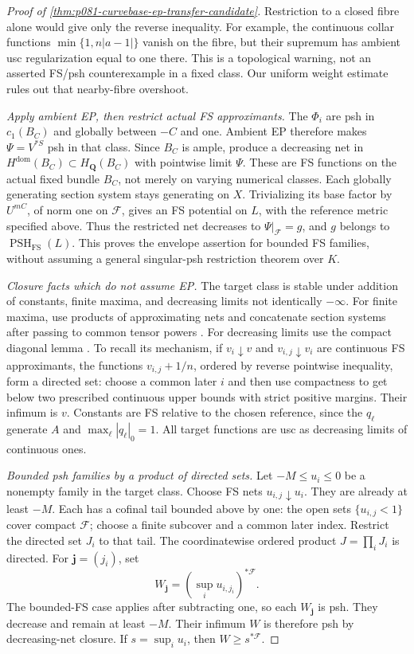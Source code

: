 \begin{proof}[Proof of \cref{thm:p081-curvebase-ep-transfer-candidate}]
Restriction to a closed fibre alone would give only the reverse
inequality. For example, the continuous collar functions
\(\min\{1,n|a-1|\}\) vanish on the fibre, but their supremum has
ambient usc regularization equal to one there. This is a topological
warning, not an asserted FS/psh counterexample in a fixed class.
Our uniform weight estimate rules out that nearby-fibre overshoot.

\emph{Apply ambient EP, then restrict actual FS approximants.}
The \(\Phi_i\) are psh in \(c_1(B_C)\) and globally between \(-C\)
and one. Ambient EP therefore makes
\(\Psi=V^{*S}\) psh in that class. Since \(B_C\) is ample,
\cite[Theorem~4.15(iii) and Example~3.9]{BJ22} produce a decreasing
net in \(H^{\mathrm{dom}}(B_C)\subset H_{\mathbf Q}(B_C)\)
with pointwise limit \(\Psi\). These are FS functions on the actual
fixed bundle \(B_C\), not merely on varying numerical classes.
Each globally generating section system stays generating on \(X\).
Trivializing its base factor by \(U^{mC}\), of norm one on
\(\mathcal F\), gives an FS potential on \(L\), with the reference
metric specified above. Thus the restricted net decreases to
\(\Psi|_{\mathcal F}=g\), and \(g\) belongs to
\(\operatorname{PSH}_{\mathrm{FS}}(L)\).
This proves the envelope assertion for bounded FS families, without
assuming a general singular-psh restriction theorem over \(K\).

\emph{Closure facts which do not assume EP.}
The target class is stable under addition of constants, finite maxima,
and decreasing limits not identically \(-\infty\). For finite maxima,
use products of approximating nets and concatenate section systems
after passing to common tensor powers
\cite[Proposition~5.4]{BE2021}. For decreasing limits use the compact
diagonal lemma \cite[Lemma~7.4 and Corollary~7.5]{BE2021}.
To recall its mechanism, if \(v_i\downarrow v\) and
\(v_{i,j}\downarrow v_i\) are continuous FS approximants, the functions
\(v_{i,j}+1/n\), ordered by reverse pointwise inequality, form a
directed set: choose a common later \(i\) and then use compactness
to get below two prescribed continuous upper bounds with strict
positive margins. Their infimum is \(v\).
Constants are FS relative to the chosen reference, since the
\(q_\ell\) generate \(A\) and \(\max_\ell|q_\ell|_0=1\).
All target functions are usc as decreasing limits of continuous ones.

\emph{Bounded psh families by a product of directed sets.}
Let \(-M\leq u_i\leq0\) be a nonempty family in the target class.
Choose FS nets \(u_{i,j}\downarrow u_i\).
They are already at least \(-M\). Each has a cofinal tail bounded
above by one: the open sets \(\{u_{i,j}<1\}\) cover compact
\(\mathcal F\); choose a finite subcover and a common later index.
Restrict the directed set \(J_i\) to that tail.
The coordinatewise ordered product \(J=\prod_iJ_i\) is directed.
For \(\boldsymbol j=(j_i)\), set
\[
             W_{\boldsymbol j}=(\sup_i u_{i,j_i})^{*\mathcal F}.
\]
The bounded-FS case applies after subtracting one, so each
\(W_{\boldsymbol j}\) is psh. They decrease and remain at least
\(-M\). Their infimum \(W\) is therefore psh by decreasing-net closure.
If \(s=\sup_i u_i\), then \(W\geq s^{*\mathcal F}\).


\end{proof}
